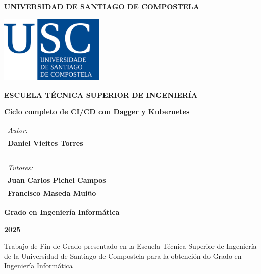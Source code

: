 \pagestyle{empty}
\begin{center}
	{\bf\Large UNIVERSIDAD DE SANTIAGO DE COMPOSTELA}
	
	\vspace{0.5cm}
	\includegraphics[width=5cm]{figuras/logo_usc.eps}
	
	\vspace{0.5cm}
	{\bf\large ESCUELA TÉCNICA SUPERIOR DE INGENIERÍA}
	
	\vspace{3cm}
	{\bf\LARGE Ciclo completo de CI/CD con Dagger y Kubernetes}
	
\end{center}

\vspace{2cm}
\hspace{4cm}\begin{tabular}{l}
	{\it\Large Autor:} \\
	{\bf\Large Daniel Vieites Torres} \\
	~ \\
	{\it\Large Tutores:} \\
	{\bf\Large Juan Carlos Pichel Campos} \\
	{\bf\Large Francisco Maseda Muiño} \\
\end{tabular}

\vspace{2cm}
\begin{center}
	{\bf\Large Grado en Ingeniería Informática}
	
	\vspace{0.5cm}
	{\bf\large  2025}
	
	\vspace{0.5cm}
	Trabajo de Fin de Grado presentado en la Escuela Técnica Superior de Ingeniería de la Universidad de Santiago de Compostela para la obtención do Grado en Ingeniería Informática
\end{center}

